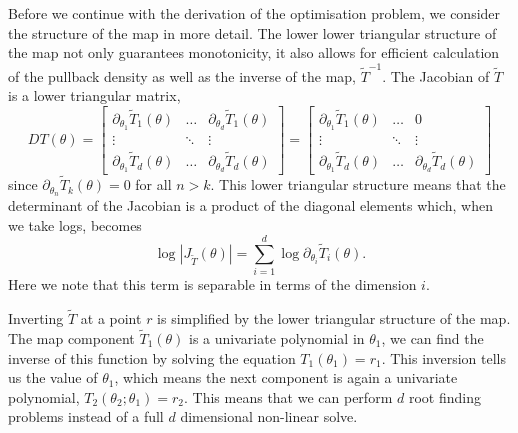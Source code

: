 \documentclass[final]{siamltex}
\begin{document}
Before we continue with the derivation of the optimisation problem, we consider the structure
of the map in more detail. The lower lower triangular structure of the map not only guarantees monotonicity, it also allows for efficient calculation of the pullback density as well as the inverse of the map, $\tilde{T}^{-1}$. The Jacobian of $\tilde{T}$ is a lower triangular matrix,
\[
	DT(\theta) = \begin{bmatrix}
		\partial_{\theta_1} \tilde{T}_1(\theta) & \dots & \partial_{\theta_d} \tilde{T}_1(\theta)\\
		\vdots & \ddots & \vdots \\
		\partial_{\theta_1} \tilde{T}_d(\theta) & \dots & \partial_{\theta_d} \tilde{T}_d(\theta)
	\end{bmatrix} = \begin{bmatrix}
		\partial_{\theta_1} \tilde{T}_1(\theta) & \dots & 0\\
		\vdots & \ddots & \vdots \\
		\partial_{\theta_1} \tilde{T}_d(\theta) & \dots & \partial_{\theta_d} \tilde{T}_d(\theta)
	\end{bmatrix}
\]
since $\partial_{\theta_n} \tilde{T}_k(\theta) = 0$ for all $n > k$. This lower triangular structure means that the determinant of the Jacobian is a product of the diagonal elements which, when we take logs, becomes
\begin{equation}\label{eqn:separable_jacobian}
	\log\left|J_{\tilde{T}}(\theta)\right| = \sum\limits_{i=1}^d \! \log \partial_{\theta_i} \tilde{T}_i(\theta).
\end{equation}
Here we note that this term is separable in terms of the dimension $i$.


Inverting $\tilde{T}$ at a point $r$ is simplified by the lower triangular structure of the map. The map component $\tilde{T}_1(\theta)$ is a univariate polynomial in $\theta_1$, we can find the inverse of this function by solving the equation $T_1(\theta_1) = r_1$. This inversion tells us the value of $\theta_1$, which means the next component is again a univariate polynomial, $T_2(\theta_2; \theta_1)=r_2$. This means that we can perform $d$ root finding problems instead of a full $d$ dimensional non-linear solve.
\end{document}
